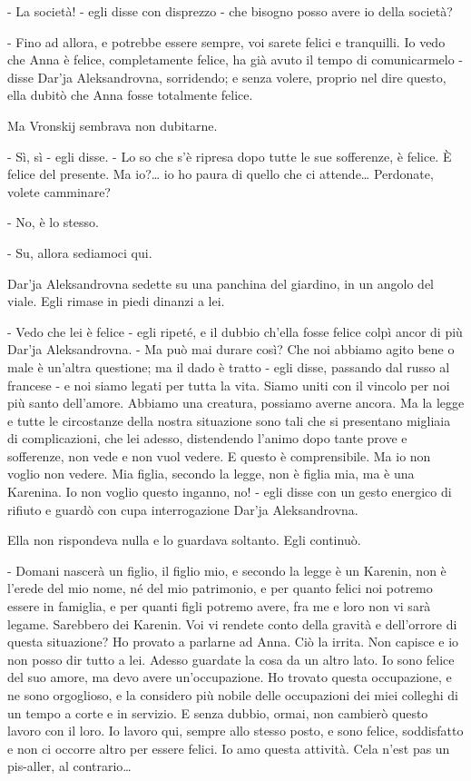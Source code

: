 - La società! - egli disse con disprezzo - che bisogno posso avere io della società? 

- Fino ad allora, e potrebbe essere sempre, voi sarete felici e tranquilli. Io vedo che Anna è felice, completamente felice, ha già avuto il tempo di comunicarmelo - disse Dar'ja Aleksandrovna, sorridendo; e senza volere, proprio nel dire questo, ella dubitò che Anna fosse totalmente felice. 

Ma Vronskij sembrava non dubitarne. 

- Sì, sì - egli disse. - Lo so che s'è ripresa dopo tutte le sue sofferenze, è felice. È felice del presente. Ma io?\ldots{} io ho paura di quello che ci attende\ldots{} Perdonate, volete camminare? 

- No, è lo stesso. 

- Su, allora sediamoci qui. 

Dar'ja Aleksandrovna sedette su una panchina del giardino, in un angolo del viale. Egli rimase in piedi dinanzi a lei. 

- Vedo che lei è felice - egli ripeté, e il dubbio ch'ella fosse felice colpì ancor di più Dar'ja Aleksandrovna. - Ma può mai durare così? Che noi abbiamo agito bene o male è un'altra questione; ma il dado è tratto - egli disse, passando dal russo al francese - e noi siamo legati per tutta la vita. Siamo uniti con il vincolo per noi più santo dell'amore. Abbiamo una creatura, possiamo averne ancora. Ma la legge e tutte le circostanze della nostra situazione sono tali che si presentano migliaia di complicazioni, che lei adesso, distendendo l'animo dopo tante prove e sofferenze, non vede e non vuol vedere. E questo è comprensibile. Ma io non voglio non vedere. Mia figlia, secondo la legge, non è figlia mia, ma è una Karenina. Io non voglio questo inganno, no! - egli disse con un gesto energico di rifiuto e guardò con cupa interrogazione Dar'ja Aleksandrovna. 

Ella non rispondeva nulla e lo guardava soltanto. Egli continuò. 

- Domani nascerà un figlio, il figlio mio, e secondo la legge è un Karenin, non è l'erede del mio nome, né del mio patrimonio, e per quanto felici noi potremo essere in famiglia, e per quanti figli potremo avere, fra me e loro non vi sarà legame. Sarebbero dei Karenin. Voi vi rendete conto della gravità e dell'orrore di questa situazione? Ho provato a parlarne ad Anna. Ciò la irrita. Non capisce e io non posso dir tutto a lei. Adesso guardate la cosa da un altro lato. Io sono felice del suo amore, ma devo avere un'occupazione. Ho trovato questa occupazione, e ne sono orgoglioso, e la considero più nobile delle occupazioni dei miei colleghi di un tempo a corte e in servizio. E senza dubbio, ormai, non cambierò questo lavoro con il loro. Io lavoro qui, sempre allo stesso posto, e sono felice, soddisfatto e non ci occorre altro per essere felici. Io amo questa attività. Cela n'est pas un pis-aller, al contrario\ldots{} 

